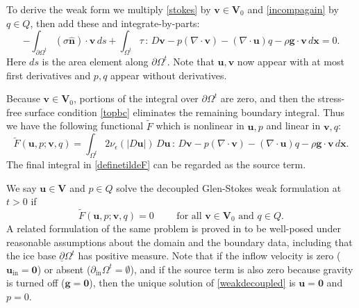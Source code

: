 \documentclass[letterpaper,final,12pt,reqno]{amsart}
\newcommand{\eps}{\epsilon}
\newcommand{\hbn}{\hat{\mathbf{n}}}
\newcommand{\bg}{\mathbf{g}}
\newcommand{\bu}{\mathbf{u}}
\newcommand{\bv}{\mathbf{v}}
\newcommand{\bx}{\mathbf{x}}
\newcommand{\bV}{\mathbf{V}}
\newcommand{\bzero}{\bm{0}}
\begin{document}
To derive the weak form we multiply \eqref{stokes} by $\bv\in \bV_0$ and \eqref{incompagain} by $q\in Q$, then add these and integrate-by-parts:
\begin{equation}
-\int_{\partial\Omega^t} (\sigma \hbn)\cdot \bv\,ds + \int_{\Omega^t} \tau \,:\,D\bv - p (\nabla \cdot \bv) - \left(\nabla \cdot \bu\right) q - \rho \mathbf{g} \cdot \bv \,d\bx = 0. \label{nonfunctwo}
\end{equation}
Here $ds$ is the area element along $\partial\Omega^t$.  Note that $\bu,\bv$ now appear with at most first derivatives and $p,q$ appear without derivatives.

Because $\bv\in \bV_0$, portions of the integral over $\partial\Omega^t$ are zero, and then the stress-free surface condition \eqref{topbc} eliminates the remaining boundary integral.  Thus we have the following functional $\tilde F$ which is nonlinear in $\bu,p$ and linear in $\bv,q$:
\begin{equation}
\tilde F(\bu,p;\bv,q) = \int_{\Omega^t} 2 \nu_\eps(|D\bu|)\, D\bu\,:\,D\bv - p (\nabla \cdot \bv) - \left(\nabla \cdot \bu\right) q - \rho \mathbf{g} \cdot \bv \,d\bx. \label{definetildeF}
\end{equation}
The final integral in \eqref{definetildeF} can be regarded as the source term.

We say $\bu\in \bV$ and $p\in Q$ solve the decoupled Glen-Stokes weak formulation at $t>0$ if
\begin{equation}
\tilde F(\bu,p;\bv,q) = 0 \qquad \text{ for all } \bv\in \bV_0 \text{ and } q\in Q.  \label{weakdecoupled}
\end{equation}
A related formulation of the same problem is proved in \cite[Theorem 3.8]{JouvetRappaz2011} to be well-posed under reasonable assumptions about the domain and the boundary data, including that the ice base $\underline{\partial} \Omega^t$ has positive measure.  Note that if the inflow velocity is zero ($\bu_{\text{in}}=\bzero$) or absent ($\partial_{\text{in}} \Omega^t = \emptyset$), and if the source term is also zero because gravity is turned off ($\bg=\bzero$), then the unique solution of \eqref{weakdecoupled} is $\bu=\bzero$ and $p=0$.
\end{document}
